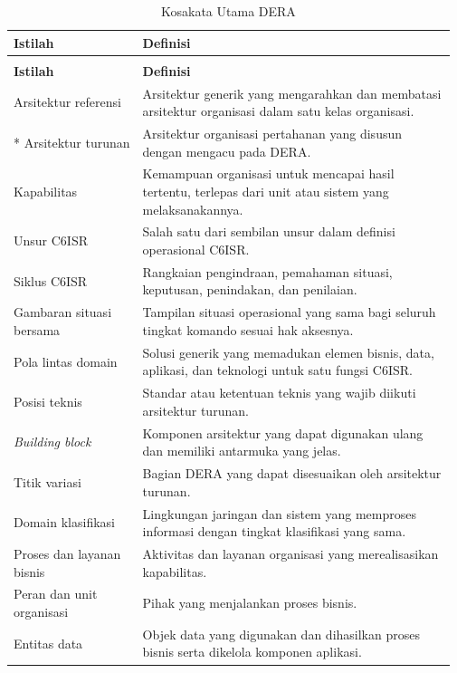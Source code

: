 \begingroup\small{}
\begin{longtable}{@{}>{\raggedright\arraybackslash\hspace{0pt}}p{0.281\linewidth}>{\raggedright\arraybackslash\hspace{0pt}}p{0.688\linewidth}@{}}
\caption{Kosakata Utama DERA}\label{tab:III.10}\\
\toprule
\textbf{Istilah} & \textbf{Definisi}\\
\midrule
\endfirsthead
\multicolumn{2}{@{}l}{\small\itshape \tablename\ \thetable{} (lanjutan)}\\
\toprule
\textbf{Istilah} & \textbf{Definisi}\\
\midrule
\endhead
\bottomrule
\endlastfoot
Arsitektur referensi & Arsitektur generik yang mengarahkan dan membatasi arsitektur organisasi dalam satu kelas organisasi.\\*
Arsitektur turunan & Arsitektur organisasi pertahanan yang disusun dengan mengacu pada DERA.\\
Kapabilitas & Kemampuan organisasi untuk mencapai hasil tertentu, terlepas dari unit atau sistem yang melaksanakannya.\\
Unsur C6ISR & Salah satu dari sembilan unsur dalam definisi operasional C6ISR.\\
Siklus C6ISR & Rangkaian pengindraan, pemahaman situasi, keputusan, penindakan, dan penilaian.\\
Gambaran situasi bersama & Tampilan situasi operasional yang sama bagi seluruh tingkat komando sesuai hak aksesnya.\\
Pola lintas domain & Solusi generik yang memadukan elemen bisnis, data, aplikasi, dan teknologi untuk satu fungsi C6ISR.\\
Posisi teknis & Standar atau ketentuan teknis yang wajib diikuti arsitektur turunan.\\
\textit{Building block} & Komponen arsitektur yang dapat digunakan ulang dan memiliki antarmuka yang jelas.\\
Titik variasi & Bagian DERA yang dapat disesuaikan oleh arsitektur turunan.\\
Domain klasifikasi & Lingkungan jaringan dan sistem yang memproses informasi dengan tingkat klasifikasi yang sama.\\
Proses dan layanan bisnis & Aktivitas dan layanan organisasi yang merealisasikan kapabilitas.\\
Peran dan unit organisasi & Pihak yang menjalankan proses bisnis.\\
Entitas data & Objek data yang digunakan dan dihasilkan proses bisnis serta dikelola komponen aplikasi.\\

\end{longtable}
